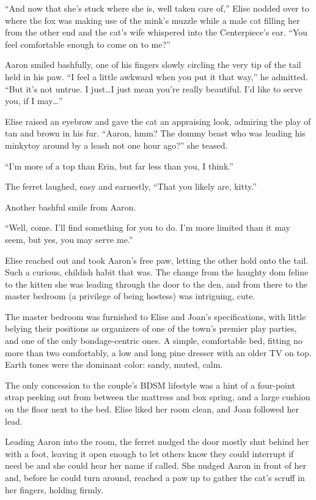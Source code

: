 \documentclass[12pt,letterpaper,oneside]{memoir}
\begin{document}
  ``And now that she's stuck where she is, well taken care of,'' Elise nodded over to where the fox was making use of the mink's muzzle while a male cat filling her from the other end and the cat's wife whispered into the Centerpiece's ear. ``You feel comfortable enough to come on to me?''

  Aaron smiled bashfully, one of his fingers slowly circling the very tip of the tail held in his paw. ``I feel a little awkward when you put it that way,'' he admitted. ``But it's not untrue. I just\ldots{}I just mean you're really beautiful. I'd like to serve you, if I may\ldots{}''

  Elise raised an eyebrow and gave the cat an appraising look, admiring the play of tan and brown in his fur. ``Aaron, hmm? The dommy beast who was leading his minkytoy around by a leash not one hour ago?'' she teased.

  ``I'm more of a top than Erin, but far less than you, I think.''

  The ferret laughed, easy and earnestly, ``That you likely are, kitty.''

  Another bashful smile from Aaron.

  ``Well, come. I'll find something for you to do. I'm more limited than it may seem, but yes, you may serve me.''

  Elise reached out and took Aaron's free paw, letting the other hold onto the tail. Such a curious, childish habit that was. The change from the haughty dom feline to the kitten she was leading through the door to the den, and from there to the master bedroom (a privilege of being hostess) was intriguing, cute.

  The master bedroom was furnished to Elise and Joan's specifications, with little belying their positions as organizers of one of the town's premier play parties, and one of the only bondage-centric ones.  A simple, comfortable bed, fitting no more than two comfortably, a low and long pine dresser with an older TV on top. Earth tones were the dominant color: sandy, muted, calm.

  The only concession to the couple's BDSM lifestyle was a hint of a four-point strap peeking out from between the mattress and box spring, and a large cushion on the floor next to the bed. Elise liked her room clean, and Joan followed her lead.

  Leading Aaron into the room, the ferret nudged the door mostly shut behind her with a foot, leaving it open enough to let others know they could interrupt if need be and she could hear her name if called. She nudged Aaron in front of her and, before he could turn around, reached a paw up to gather the cat's scruff in her fingers, holding firmly.
\end{document}
